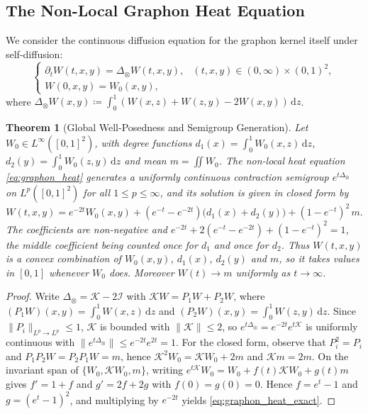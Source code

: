 \documentclass[11pt,a4paper,reqno]{amsart}
\newtheorem{theorem}{Theorem}[section]
\theoremstyle{definition}
\numberwithin{equation}{section}
\newcommand{\dif}{\,\mathrm{d}}
\begin{document}
\subsection{The Non-Local Graphon Heat Equation}
We consider the continuous diffusion equation for the graphon kernel itself under self-diffusion:
\begin{equation}
    \label{eq:graphon_heat}
    \begin{cases}
        \partial_t W(t, x, y) = \Delta_{\otimes} W(t, x, y), & (t, x, y) \in (0, \infty) \times (0, 1)^2, \\
        W(0, x, y) = W_0(x, y),
    \end{cases}
\end{equation}
where $\Delta_\otimes W(x, y) \coloneqq \int_0^1 (W(x, z) + W(z, y) - 2 W(x, y)) \dif z$.

\begin{theorem}[Global Well-Posedness and Semigroup Generation]
\label{thm:graphon_heat_existence}
Let $W_0 \in L^\infty([0, 1]^2)$, with degree functions $d_1(x) = \int_0^1 W_0(x,z)\dif z$, $d_2(y) = \int_0^1 W_0(z,y)\dif z$ and mean $m = \iint W_0$. The non-local heat equation \eqref{eq:graphon_heat} generates a uniformly continuous contraction semigroup $e^{t \Delta_\otimes}$ on $L^p([0, 1]^2)$ for all $1 \le p \le \infty$, and its solution is given in closed form by
\begin{equation}
    \label{eq:graphon_heat_exact}
    W(t, x, y) = e^{-2t} W_0(x, y) + (e^{-t} - e^{-2t}) \big(d_1(x) + d_2(y)\big) + (1 - e^{-t})^2\, m .
\end{equation}
The coefficients are non-negative and $e^{-2t} + 2(e^{-t} - e^{-2t}) + (1-e^{-t})^2 = 1$, the middle coefficient being counted once for $d_1$ and once for $d_2$. Thus $W(t,x,y)$ is a convex combination of $W_0(x,y)$, $d_1(x)$, $d_2(y)$ and $m$, so it takes values in $[0,1]$ whenever $W_0$ does. Moreover $W(t) \to m$ uniformly as $t \to \infty$.
\end{theorem}
\begin{proof}
Write $\Delta_\otimes = \mathcal{K} - 2\mathcal{I}$ with $\mathcal{K} W = P_1 W + P_2 W$, where $(P_1W)(x,y) = \int_0^1 W(x,z)\dif z$ and $(P_2 W)(x,y) = \int_0^1 W(z,y)\dif z$. Since $\|P_i\|_{L^p \to L^p} \le 1$, $\mathcal{K}$ is bounded with $\|\mathcal{K}\| \le 2$, so $e^{t\Delta_\otimes} = e^{-2t}e^{t\mathcal{K}}$ is uniformly continuous with $\|e^{t\Delta_\otimes}\| \le e^{-2t}e^{2t} = 1$. For the closed form, observe that $P_i^2 = P_i$ and $P_1 P_2 W = P_2 P_1 W = m$, hence $\mathcal{K}^2 W_0 = \mathcal{K} W_0 + 2m$ and $\mathcal{K} m = 2m$. On the invariant span of $\{W_0, \mathcal{K}W_0, m\}$, writing $e^{t\mathcal{K}} W_0 = W_0 + f(t)\mathcal{K}W_0 + g(t) m$ gives $f' = 1 + f$ and $g' = 2f + 2g$ with $f(0) = g(0) = 0$. Hence $f = e^t - 1$ and $g = (e^t - 1)^2$, and multiplying by $e^{-2t}$ yields \eqref{eq:graphon_heat_exact}.
\end{proof}
\end{document}

